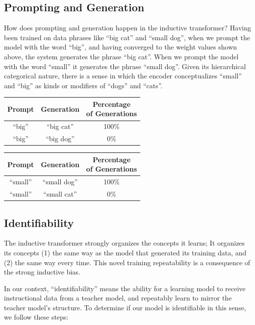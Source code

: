 \documentclass{article}
\begin{document}
\subsection{Prompting and Generation}

How does prompting and generation happen in the inductive transformer?  Having been trained on data phrases like ``big cat'' and ``small dog'', when we prompt the model with the word ``big'', and having converged to the weight values shown above, the system generates the phrase ``big cat''.  When we prompt the model with the word ``small'' it generates the phrase ``small dog''.  Given its hierarchical categorical nature, there is a sense in which the encoder conceptualizes ``small'' and ``big'' as kinds or modifiers of ``dogs'' and ``cats''.

\begin{tabular}{ccc}
\hline\hline
Prompt & Generation &  \thead{Percentage \\ of Generations} \\[1ex]
\hline\hline
``big'' & ``big cat'' & 100\% \\
``big'' & ``big dog'' & 0\% \\
\hline
\end{tabular}
\quad\quad\quad
\begin{tabular}{ccc}
\hline\hline
Prompt & Generation &  \thead{Percentage \\ of Generations} \\[1ex]
\hline
``small'' & ``small dog'' & 100\% \\
``small'' & ``small cat'' & 0\% \\
\hline
\end{tabular}

\subsection{Identifiability}

The inductive transformer strongly organizes the concepts it learns; It organizes its concepts (1) the same way as the model that generated its training data, and (2) the same way every time.  This novel training repeatability is a consequence of the strong inductive bias.

In our context, ``identifiability'' means the ability for a learning model to receive instructional data from a teacher model, and repeatably learn to mirror the teacher model's structure.  To determine if our model is identifiable in this sense, we follow these steps:
\end{document}
